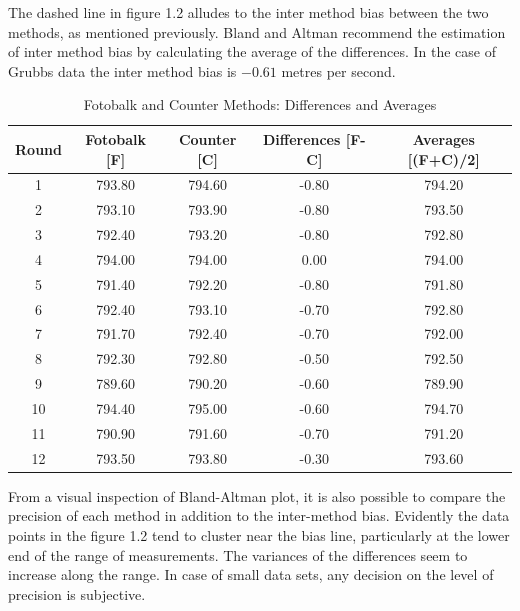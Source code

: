 \documentclass[12pt, a4paper]{report}
\begin{document}
The dashed line in figure 1.2 alludes to the inter method bias between the two methods, as mentioned previously. Bland and Altman
recommend the estimation of inter method bias by calculating the average of the differences. In the case of Grubbs data the inter
method bias is $-0.61$ metres per second.
\newpage
\begin{table}[tbh]
\begin{center}

\begin{tabular}{|c|c|c|c|c|}
  \hline
 Round & Fotobalk [F] & Counter [C] & Differences [F-C] & Averages [(F+C)/2] \\
  \hline
1 & 793.80 & 794.60 & -0.80 & 794.20 \\
  2 & 793.10 & 793.90 & -0.80 & 793.50 \\
  3 & 792.40 & 793.20 & -0.80 & 792.80 \\
  4 & 794.00 & 794.00 & 0.00 & 794.00 \\
  5 & 791.40 & 792.20 & -0.80 & 791.80 \\
  6 & 792.40 & 793.10 & -0.70 & 792.80 \\
  7 & 791.70 & 792.40 & -0.70 & 792.00 \\
  8 & 792.30 & 792.80 & -0.50 & 792.50 \\
  9 & 789.60 & 790.20 & -0.60 & 789.90 \\
  10 & 794.40 & 795.00 & -0.60 & 794.70 \\
  11 & 790.90 & 791.60 & -0.70 & 791.20 \\
  12 & 793.50 & 793.80 & -0.30 & 793.60 \\
   \hline
\end{tabular}
\caption{Fotobalk and Counter Methods: Differences and Averages}
\end{center}
\end{table}

\newpage

From a visual inspection of Bland-Altman plot, it is also possible to compare the precision of each method in addition to the
inter-method bias.  Evidently the data points in the figure 1.2 tend to cluster near the bias line, particularly at the lower end
of the range of measurements. The variances of the differences seem to increase along the range. In case of small data sets, any
decision on the level of precision is subjective.
\end{document}
